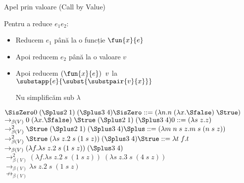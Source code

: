 \documentclass[xcolor=pdftex,romanian,colorlinks]{beamer}
\begin{document}
\begin{frame}{Apel prin valoare (Call by Value)}
\begin{block}{}
Pentru a reduce $e_1 \mathrel{} e_2$:
\begin{itemize}
\item  Reducem $e_1$ până la o funcție
$\fun{x}{e}$
\item Apoi reducem $e_2$ până la o valoare $v$
\item Apoi reducem $(\fun{x}{e})\mathrel{}v$ la $\substapp{e}{\subst{\substpair{v}{x}}}$
\item[Nu] simplificăm sub $\lambda$
\end{itemize}
\end{block}

\pause

$\SisZero 0\; (\Splus 2\; 1)\; (\Splus 3\; 4) \hfill \SisZero ::= (\lambda n. n\;(\lambda x. \Sfalse)\; \Strue)$\\
$\rightarrow_{\beta(V)} 0\;(\lambda x. \Sfalse)\; \Strue\; (\Splus 2\; 1)\; (\Splus 3\; 4) \hfill 0 ::= (\lambda s\; z.z)$\\
$\rightarrow_{\beta(V)}^2 \Strue\; (\Splus 2\; 1)\; (\Splus 3\; 4)
\hfill \Splus ::= (\lambda m\; n\; s\; z.m\; s\; (n\; s\; z))$\\
$\rightarrow_{\beta(V)}^2 \Strue\; (\lambda s\; z.2\; s\; (1\; s\; z))\; (\Splus 3\; 4) \hfill \Strue ::= \lambda t\; f.t$\\
$\rightarrow_{\beta(V)} (\lambda f.\lambda s\; z.2\; s\; (1\; s\; z))\;(\Splus 3\; 4)$\\
$\rightarrow_{\beta(V)}^2 (\lambda f.\lambda s\; z.2\; s\; (1\; s\; z))\;(\lambda s\; z.3\; s\; (4\; s\; z))$\\
$\rightarrow_{\beta(V)} \lambda s\; z.2\; s\; (1\; s\; z)$\\
$\not\rightarrow_{\beta(V)}$

\end{frame}
\end{document}
